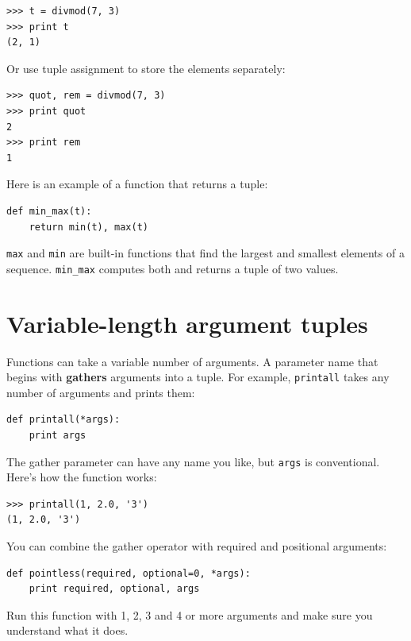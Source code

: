 \documentclass[10pt]{book}
\begin{document}
\beforeverb
\begin{verbatim}
>>> t = divmod(7, 3)
>>> print t
(2, 1)
\end{verbatim}
\afterverb
%
Or use tuple assignment to store the elements separately:


\beforeverb
\begin{verbatim}
>>> quot, rem = divmod(7, 3)
>>> print quot
2
>>> print rem
1
\end{verbatim}
\afterverb
%
Here is an example of a function that returns a tuple:

\beforeverb
\begin{verbatim}
def min_max(t):
    return min(t), max(t)
\end{verbatim}
\afterverb
%
{\tt max} and {\tt min} are built-in functions that find
the largest and smallest elements of a sequence.  \verb"min_max"
computes both and returns a tuple of two values.



\section{Variable-length argument tuples}


Functions can take a variable number of arguments.  A parameter
name that begins with {\tt *} {\bf gathers} arguments into
a tuple.  For example, {\tt printall}
takes any number of arguments and prints them:

\beforeverb
\begin{verbatim}
def printall(*args):
    print args
\end{verbatim}
\afterverb
%
The gather parameter can have any name you like, but {\tt args} is
conventional.  Here's how the function works:

\beforeverb
\begin{verbatim}
>>> printall(1, 2.0, '3')
(1, 2.0, '3')
\end{verbatim}
\afterverb
%
You can combine the gather operator with required and positional
arguments:

\beforeverb
\begin{verbatim}
def pointless(required, optional=0, *args):
    print required, optional, args
\end{verbatim}
\afterverb
%
Run this function with 1, 2, 3 and 4 or more arguments and
make sure you understand what it does.
\end{document}
